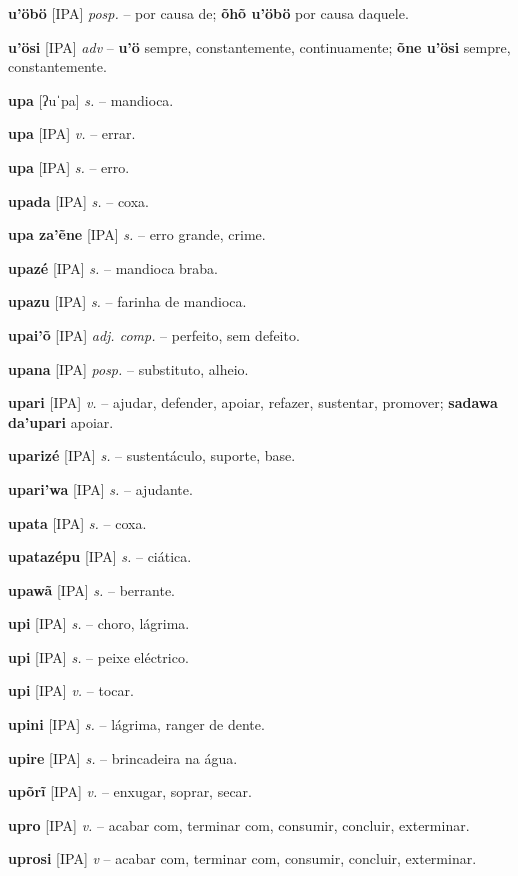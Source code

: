 \textbf{u'öbö} [IPA] \textit{posp.} -- por causa de; \textbf{õhõ u'öbö} por causa daquele.

\textbf{u'ösi} [IPA] \textit{adv} -- \textbf{u'ö} sempre, constantemente, continuamente; \textbf{õne u'ösi} sempre, constantemente.

\textbf{upa} [ʔuˈpa] \textit{s.} -- mandioca.

\textbf{upa} [IPA] \textit{v.} -- errar.

\textbf{upa} [IPA] \textit{s.} -- erro.

\textbf{upada} [IPA] \textit{s.} -- coxa.

\textbf{upa za'ẽne} [IPA] \textit{s.} -- erro grande, crime.

\textbf{upazé} [IPA] \textit{s.} -- mandioca braba.

\textbf{upazu} [IPA] \textit{s.} -- farinha de mandioca.

\textbf{upai'õ} [IPA] \textit{adj. comp.} -- perfeito, sem defeito.

\textbf{upana} [IPA] \textit{posp.} -- substituto, alheio.

\textbf{upari} [IPA] \textit{v.} -- ajudar, defender, apoiar, refazer, sustentar, promover; \textbf{sadawa da'upari} apoiar.

\textbf{uparizé} [IPA] \textit{s.} -- sustentáculo, suporte, base.

\textbf{upari'wa} [IPA] \textit{s.} -- ajudante.

\textbf{upata} [IPA] \textit{s.} -- coxa.

\textbf{upatazépu} [IPA] \textit{s.} -- ciática.

\textbf{upawã} [IPA] \textit{s.} -- berrante.

\textbf{upi} [IPA] \textit{s.} -- choro, lágrima.

\textbf{upi} [IPA] \textit{s.} -- peixe eléctrico.

\textbf{upi} [IPA] \textit{v.} -- tocar.

\textbf{upini} [IPA] \textit{s.} -- lágrima, ranger de dente.

\textbf{upire} [IPA] \textit{s.} -- brincadeira na água.

\textbf{upõrĩ} [IPA] \textit{v.} -- enxugar, soprar, secar.

\textbf{upro} [IPA] \textit{v.} -- acabar com, terminar com, consumir, concluir, exterminar.

\textbf{uprosi} [IPA] \textit{v} -- acabar com, terminar com, consumir, concluir, exterminar.

